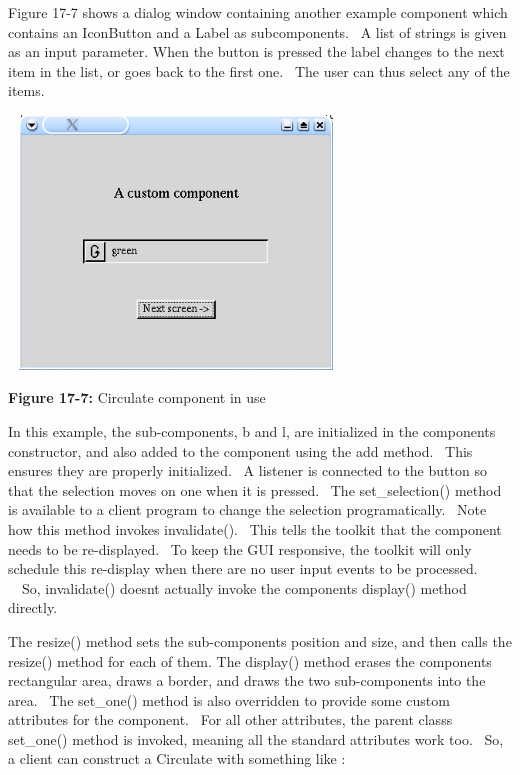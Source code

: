 Figure 17-7 shows a dialog window containing another example component
which contains an IconButton and a Label as subcomponents. \ A list of
strings is given as an input parameter. When the button is pressed the
label changes to the next item in the list, or goes back to the first
one. \ The user can thus select any of the items.

\begin{center}
\includegraphics[width=3.4992in,height=2.6543in]{ub-img/ub-img56.jpg}
\end{center}

{\sffamily\bfseries Figure 17-7:}
{\sffamily Circulate component in use}

\bigskip

In this example, the sub-components, \textsf{b} and \textsf{l}, are
initialized in the component{\textquotesingle}s constructor, and also
added to the component using the \textsf{add} method. \ This ensures
they are properly initialized. \ A listener is connected to the button
so that the selection moves on one when it is pressed. \ The
\textsf{set\_selection()} method is available to a client program to
change the selection programatically. \ Note how this method invokes
\textsf{invalidate()}. \ This tells the toolkit that the component
needs to be re-displayed. \ To keep the GUI responsive, the toolkit
will only schedule this re-display when there are no user input events
to be processed. \ \ So, \textsf{invalidate()} doesn{\textquotesingle}t
actually invoke the component{\textquotesingle}s \textsf{display()}
method directly.

The \textsf{resize()} method sets the sub-components{\textquotesingle}
position and size, and then calls the \textsf{resize()} method for each
of them. The \textsf{display()} method erases the
component{\textquotesingle}s rectangular area, draws a border, and
draws the two sub-components into the area. \ The \textsf{set\_one()}
method is also overridden to provide some custom attributes for the
component. \ For all other attributes, the parent
class{\textquotesingle}s \textsf{set\_one()} method is invoked, meaning
all the standard attributes work too. \ So, a client can construct a
\textsf{Circulate} with something like :

